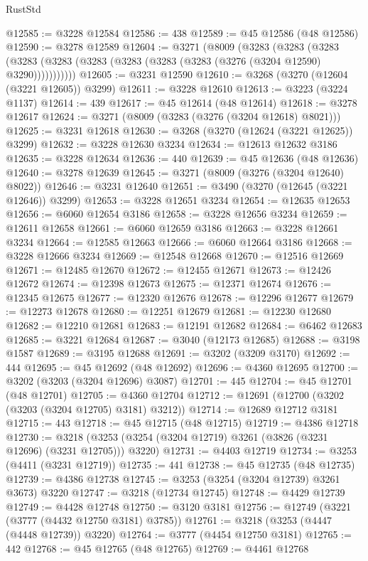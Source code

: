 \begin{lexlean}{RustStd}
\begin{coremodule}
@12585 := @3228 @12584
@12586 := 438
@12589 := @45 @12586 (@48 @12586)
@12590 := @3278 @12589
@12604 := @3271
    (@8009
      (@3283
        (@3283
          (@3283 (@3283 (@3283 (@3283 (@3283 (@3283 (@3283 (@3276 (@3204 @12590) @3290)))))))))))
@12605 := @3231 @12590
@12610 := @3268 (@3270 (@12604 (@3221 @12605)) @3299)
@12611 := @3228 @12610
@12613 := @3223 (@3224 @1137)
@12614 := 439
@12617 := @45 @12614 (@48 @12614)
@12618 := @3278 @12617
@12624 := @3271 (@8009 (@3283 (@3276 (@3204 @12618) @8021)))
@12625 := @3231 @12618
@12630 := @3268 (@3270 (@12624 (@3221 @12625)) @3299)
@12632 := @3228 @12630 @3234
@12634 := @12613 @12632 @3186
@12635 := @3228 @12634
@12636 := 440
@12639 := @45 @12636 (@48 @12636)
@12640 := @3278 @12639
@12645 := @3271 (@8009 (@3276 (@3204 @12640) @8022))
@12646 := @3231 @12640
@12651 := @3490 (@3270 (@12645 (@3221 @12646)) @3299)
@12653 := @3228 @12651 @3234
@12654 := @12635 @12653
@12656 := @6060 @12654 @3186
@12658 := @3228 @12656 @3234
@12659 := @12611 @12658
@12661 := @6060 @12659 @3186
@12663 := @3228 @12661 @3234
@12664 := @12585 @12663
@12666 := @6060 @12664 @3186
@12668 := @3228 @12666 @3234
@12669 := @12548 @12668
@12670 := @12516 @12669
@12671 := @12485 @12670
@12672 := @12455 @12671
@12673 := @12426 @12672
@12674 := @12398 @12673
@12675 := @12371 @12674
@12676 := @12345 @12675
@12677 := @12320 @12676
@12678 := @12296 @12677
@12679 := @12273 @12678
@12680 := @12251 @12679
@12681 := @12230 @12680
@12682 := @12210 @12681
@12683 := @12191 @12682
@12684 := @6462 @12683
@12685 := @3221 @12684
@12687 := @3040 (@12173 @12685)
@12688 := @3198 @1587
@12689 := @3195 @12688
@12691 := @3202 (@3209 @3170)
@12692 := 444
@12695 := @45 @12692 (@48 @12692)
@12696 := @4360 @12695
@12700 := @3202 (@3203 (@3204 @12696) @3087)
@12701 := 445
@12704 := @45 @12701 (@48 @12701)
@12705 := @4360 @12704
@12712 := @12691 (@12700 (@3202 (@3203 (@3204 @12705) @3181) @3212))
@12714 := @12689 @12712 @3181
@12715 := 443
@12718 := @45 @12715 (@48 @12715)
@12719 := @4386 @12718
@12730 := @3218 (@3253 (@3254 (@3204 @12719) @3261 (@3826 (@3231 @12696) (@3231 @12705))) @3220)
@12731 := @4403 @12719
@12734 := @3253 (@4411 (@3231 @12719))
@12735 := 441
@12738 := @45 @12735 (@48 @12735)
@12739 := @4386 @12738
@12745 := @3253 (@3254 (@3204 @12739) @3261 @3673) @3220
@12747 := @3218 (@12734 @12745)
@12748 := @4429 @12739
@12749 := @4428 @12748
@12750 := @3120 @3181
@12756 := @12749 (@3221 (@3777 (@4432 @12750 @3181) @3785))
@12761 := @3218 (@3253 (@4447 (@4448 @12739)) @3220)
@12764 := @3777 (@4454 @12750 @3181)
@12765 := 442
@12768 := @45 @12765 (@48 @12765)
@12769 := @4461 @12768

\end{coremodule}
\end{lexlean}
